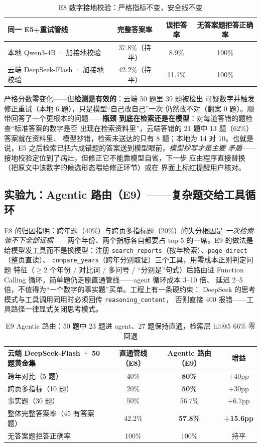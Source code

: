 \documentclass[UTF8,11pt]{ctexart}
\begin{document}
\begin{table}[H]
\centering\small
\begin{tabular}{lccc}
\toprule
同一 E5+重试管线 & 完整答案率 & 误拒答率 & 无答案题拒答正确率 \\
\midrule
本地 Qwen3-4B · 加接地校验 & 37.8\%（持平） & 8.9\% & 100\% \\
云端 DeepSeek-Flash · 加接地校验 & 42.2\%（持平） & 11.1\% & 100\% \\
\bottomrule
\end{tabular}
\caption{E8 数字接地校验：严格指标不变，安全线不变}
\label{tab:e8}
\end{table}

严格分数零变化——但\textbf{检测是有效的}：云端 50 题里 39 题被检出
可疑数字并触发修正重试（本地 6 题），只是模型``自己改自己''一次
仍然改不对（翻案 0 题）。顺带回答了一个更根本的问题——\textbf{瓶颈
到底在检索还是在模型}：对每道答错的题检查``标准答案的数字是否
出现在检索资料里''，云端答错的 21 题中 13 题（62\%）答案就在资料里、
模型抄错，检索未送达的只有 8 题；本地为 14 对 10。也就是说，E5
之后检索已把六成错题的答案送到模型眼前，\emph{模型抄写才是主要
矛盾}——接地校验定位到了病灶，但修正它不能靠模型自省，下一步
应由程序直接替换（把原文中该数字的候选形态喂给修正环节）或在
界面上标红提醒用户核对。

\subsection{实验九：Agentic 路由（E9）——复杂题交给工具循环}

E8 的归因指明：跨年题（40\%）与跨页多指标题（20\%）的失分根因是
\emph{一次检索装不下全部证据}——两个年份、两个指标各自都要占 top-5
的一席。E9 的做法是给模型发工具而不是换模型：注册
\texttt{search\_reports}（按年检索）、\texttt{page\_direct}（整页直读）、
\texttt{compare\_years}（跨年分别取证）三个工具，用零成本正则判定问题
特征（$\geq$2 个年份 / 对比词 / 多问号 / ``分别是''句式）后路由进
Function Calling 循环，简单题仍走原直通管线——agent 循环成本 3--10 倍、
延迟 2--5 倍，不值得为``一个数字的事实题''买单。工程上有一条硬约束：
DeepSeek 的思考模式与工具调用同用时必须回传 \texttt{reasoning\_content}，
否则直接 400 报错——工具路径一律显式关闭思考模式。

\begin{table}[H]
\centering\small
\begin{tabular}{lccc}
\toprule
云端 DeepSeek-Flash · 50 题黄金集 & 直通管线（E8） & Agentic 路由（E9） & 增益 \\
\midrule
跨年对比（5 题） & 40\% & \textbf{80\%} & +40pp \\
跨页多指标（10 题） & 20\% & \textbf{50\%} & +30pp \\
事实题（30 题） & 50\% & 56.7\% & +6.7pp \\
整体完整答案率（45 有答案题） & 42.2\% & \textbf{57.8\%} & \textbf{+15.6pp} \\
无答案题拒答正确率 & 100\% & 100\% & 持平 \\
\bottomrule
\end{tabular}
\caption{E9 Agentic 路由：50 题中 23 题进 agent、27 题保持直通，检索层 hit@5 66\% 零回退}
\label{tab:e9}
\end{table}
\end{document}
